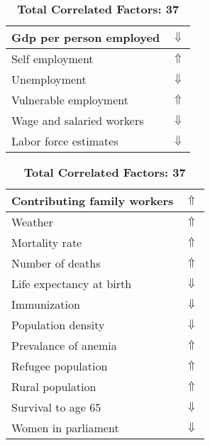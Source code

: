 \documentclass[12pt,notitlepage,oneside]{report}
\begin{document}
\begin{table}[!htb]
\begin{tabular}{|l|l|}
Gdp per person employed & $\Downarrow$\\ \hline
Self employment & $\Uparrow$\\ \hline
Unemployment & $\Downarrow$\\ \hline
Vulnerable employment & $\Uparrow$\\ \hline
Wage and salaried workers & $\Downarrow$\\ \hline
Labor force estimates & $\Downarrow$\\ \hline
\end{tabular}
\begin{tabular}{|l|l|}
\hline
Contributing family workers & $\Uparrow$\\ \hline
Weather & $\Uparrow$\\ \hline
Mortality rate & $\Uparrow$\\ \hline
Number of deaths & $\Uparrow$\\ \hline
Life expectancy at birth & $\Downarrow$\\ \hline
Immunization & $\Downarrow$\\ \hline
Population density & $\Downarrow$\\ \hline
Prevalance of anemia & $\Uparrow$\\ \hline
Refugee population & $\Uparrow$\\ \hline
Rural population & $\Uparrow$\\ \hline
Survival to age 65 & $\Downarrow$\\ \hline
Women in parliament & $\Downarrow$\\ \hline
\end{tabular}
\caption*{\textbf{Total Correlated Factors: 37}}
\end{table}
\clearpage
\end{document}

